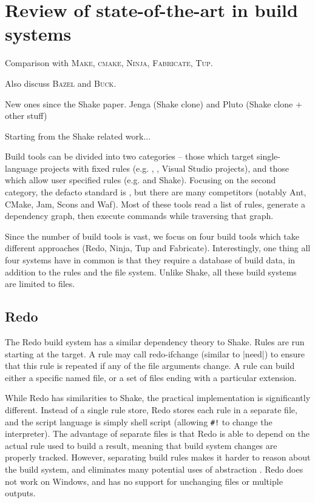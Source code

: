 \section{Review of state-of-the-art in build systems\label{section-review}}

Comparison with \textsc{Make}, \textsc{cmake}, \textsc{Ninja},
\textsc{Fabricate}, \textsc{Tup}.

Also discuss \textsc{Bazel} and \textsc{Buck}.

New ones since the Shake paper. Jenga (Shake clone) and Pluto (Shake clone + other stuff)

Starting from the Shake related work...

Build tools can be divided into two categories -- those which target single-language projects with fixed rules (e.g. , , Visual Studio projects), and those which allow user specified rules (e.g. \make{} and Shake). Focusing on the second category, the defacto standard is \make{}, but there are many \make{} competitors (notably Ant, CMake, Jam, Scons and Waf). Most of these tools read a list of rules, generate a dependency graph, then execute commands while traversing that graph.

Since the number of build tools is vast, we focus on four build tools which take different approaches (Redo, Ninja, Tup and Fabricate). Interestingly, one thing all four systems have in common is that they require a database of build data, in addition to the rules and the file system. Unlike Shake, all these build systems are limited to files.

\subsection{Redo}


The Redo build system \cite{redo} has a similar dependency theory to Shake. Rules are run starting at the target. A rule may call \textsf{redo-ifchange} (similar to |need|) to ensure that this rule is repeated if any of the file arguments change. A rule can build either a specific named file, or a set of files ending with a particular extension.

While Redo has similarities to Shake, the practical implementation is significantly different. Instead of a single rule store, Redo stores each rule in a separate file, and the script language is simply shell script (allowing \verb"#!" to change the interpreter). The advantage of separate files is that Redo is able to depend on the actual rule used to build a result, meaning that build system changes are properly tracked. However, separating build rules makes it harder to reason about the build system, and eliminates many potential uses of abstraction \cite{jonge:build_components}. Redo does not work on Windows, and has no support for unchanging files or multiple outputs.

